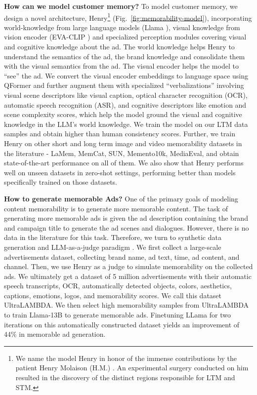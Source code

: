  
\textbf{How can we model customer memory?} To model customer memory, we design a novel architecture, Henry\footnote{We name the model Henry in honor of the immense contributions by the patient Henry Molaison (H.M.) \cite{squire2009legacy}. An experimental surgery conducted on him resulted in the discovery of the distinct regions responsible for LTM and STM.} (Fig.~\ref{fig:memorability-model}), incorporating world-knowledge from large language models (Llama \cite{touvron2023llama}), visual knowledge from vision encoder (EVA-CLIP \cite{sun2023eva}) and specialized perception modules covering visual and cognitive knowledge about the ad. The world knowledge helps Henry to understand the semantics of the ad, the brand knowledge and consolidate them with the visual semantics from the ad. The visual encoder helps the model to ``see'' the ad. We convert the visual encoder embeddings to language space using QFormer \cite{li2023blip} and further augment them with specialized ``verbalizations'' involving visual scene descriptors like visual caption, optical character recognition (OCR), automatic speech recognition (ASR), and cognitive descriptors like emotion and scene complexity scores, which help the model ground the visual and cognitive knowledge in the LLM's world knowledge. We train the model on our LTM data samples and obtain higher than human consistency scores. Further, we train Henry on other short and long term image and video memorability datasets in the literature - LaMem, MemCat, SUN, Memento10k, MediaEval, and obtain state-of-the-art performance on all of them. We also show that Henry performs well on unseen datasets in zero-shot settings, performing better than models specifically trained on those datasets.


\textbf{How to generate memorable Ads?}\label{ref:Generation Task} One of the primary goals of modeling content memorability is to generate more memorable content. The task of generating more memorable ads is given the ad description containing the brand and campaign title to generate the ad scenes and dialogues. However, there is no data in the literature for this task. Therefore, we turn to synthetic data generation and LLM-as-a-judge paradigm \cite{khandelwal2023large,zheng2023judging}.
We first collect a large-scale advertisements dataset, collecting brand name, ad text, time, ad content, and channel. Then, we use Henry as a judge to simulate memorability on the collected ads. We ultimately get a dataset of 5 million advertisements with their automatic speech transcripts, OCR, automatically detected objects, colors, aesthetics, captions, emotions, logos, and memorability scores. We call this dataset UltraLAMBDA. We then select high memorability samples from UltraLAMBDA to train Llama-13B to generate memorable ads. Finetuning LLama for two iterations on this automatically constructed dataset yields an improvement of 44\% in memorable ad generation.

